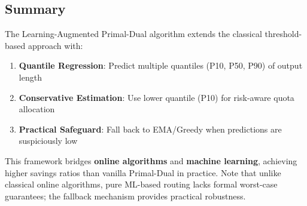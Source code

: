 \documentclass[11pt]{article}
\begin{document}
\subsection{Summary}

The Learning-Augmented Primal-Dual algorithm extends the classical threshold-based approach with:
\begin{enumerate}
  \item \textbf{Quantile Regression}: Predict multiple quantiles (P10, P50, P90) of output length
  \item \textbf{Conservative Estimation}: Use lower quantile (P10) for risk-aware quota allocation
  \item \textbf{Practical Safeguard}: Fall back to EMA/Greedy when predictions are suspiciously low
\end{enumerate}

This framework bridges \textbf{online algorithms} and \textbf{machine learning}, achieving higher savings ratios than vanilla Primal-Dual in practice. Note that unlike classical online algorithms, pure ML-based routing lacks formal worst-case guarantees; the fallback mechanism provides practical robustness.
\end{document}
